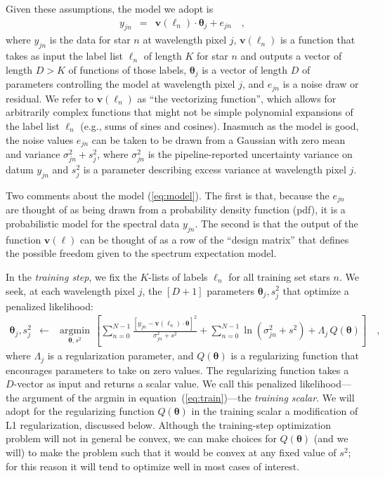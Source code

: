 \documentclass[12pt,preprint]{aastex}
\newcommand{\Dvector}[1]{\boldsymbol{#1}}
\newcommand{\vectheta}{\Dvector{\theta}}
\newcommand{\vecv}{\Dvector{v}}
\newcommand{\argmin}[1]{\underset{#1}{\operatorname{argmin}}\,}
\begin{document}
\noindent{}Given these assumptions, the model we adopt is
\begin{eqnarray}
  y_{jn} &=& \vecv(\ell_n)\cdot\vectheta_j + e_{jn}
  \label{eq:model}\quad ,
\end{eqnarray}
where $y_{jn}$ is the data for star $n$ at wavelength pixel $j$,
$\vecv(\ell_n)$ is a function that takes as input
the label list $\ell_n$ of length $K$ for star $n$
and outputs a vector of length $D>K$ of functions of those labels,
$\vectheta_j$ is a vector of length $D$ of parameters controlling the model at wavelength pixel $j$,
and $e_{jn}$ is a noise draw or residual.  We refer to $\vecv(\ell_n)$ as ``the vectorizing function'', which allows for arbitrarily complex functions that might not be simple polynomial expansions of the label list $\ell_n$ (e.g., sums of sines and cosines).  
Inasmuch as the model is good, the noise values $e_{jn}$ can be taken to be
drawn from a Gaussian with zero mean and variance $\sigma^2_{jn}+s^2_j$,
where $\sigma^2_{jn}$ is the pipeline-reported uncertainty variance on datum
$y_{jn}$ and $s^2_j$ is a parameter describing excess variance at wavelength pixel $j$.

Two comments about the model (\ref{eq:model}).
The first is that, because the $e_{jn}$ are thought of as being drawn from a 
probability density function (pdf), it is a probabilistic model for the spectral
data $y_{jn}$.
The second is that the output of the function $\vecv(\ell)$ can be thought
of as a row of the ``design matrix'' that defines the possible freedom
given to the spectrum expectation model.

In the \emph{training step}, we fix the $K$-lists of labels $\ell_n$
for all training set stars $n$.
We seek, at each wavelength pixel $j$, the $[D+1]$ parameters
$\vectheta_j,s^2_j$ that optimize a penalized likelihood:
\begin{eqnarray}\label{eq:train}
  \vectheta_j,s^2_j &\leftarrow& \argmin{\vectheta,s^2}\left[
    \sum_{n=0}^{N-1} \frac{[y_{jn}-\vecv(\ell_n)\cdot\vectheta]^2}{\sigma^2_{jn}+s^2}
    + \sum_{n=0}^{N-1} \ln(\sigma^2_{jn}+s^2)
    + \Lambda_j\,Q(\vectheta)
    \right]
  \quad ,
\end{eqnarray}
where $\Lambda_j$ is a regularization parameter, and $Q(\vectheta)$ is a 
regularizing function that encourages parameters to take on zero values.
The regularizing function takes a $D$-vector as input and returns a
scalar value.
We call this penalized likelihood---the argument of the
argmin in equation~(\ref{eq:train})---the \emph{training scalar}.
We will adopt for the regularizing function $Q(\vectheta)$ in the training scalar a
modification of L1 regularization, discussed below.
Although the training-step optimization problem will not in general be
convex, we can make choices for $Q(\vectheta)$ (and we will) to make the
problem such that it would be convex at any fixed value of $s^2$; for
this reason it will tend to optimize well in most cases of interest.
\end{document}

